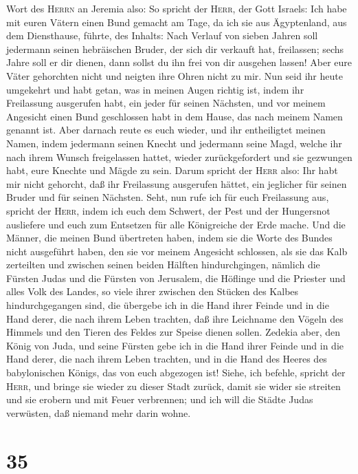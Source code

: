 Wort des \textsc{Herrn} an Jeremia also:  So spricht der
\textsc{Herr}, der Gott Israels: Ich habe mit euren Vätern einen Bund
gemacht am Tage, da ich sie aus Ägyptenland, aus dem Diensthause,
führte, des Inhalts:  Nach Verlauf von sieben Jahren soll
jedermann seinen hebräischen Bruder, der sich dir verkauft hat,
freilassen; sechs Jahre soll er dir dienen, dann sollst du ihn frei von
dir ausgehen lassen! Aber eure Väter gehorchten nicht und neigten ihre
Ohren nicht zu mir.  Nun seid ihr heute umgekehrt und
habt getan, was in meinen Augen richtig ist, indem ihr Freilassung
ausgerufen habt, ein jeder für seinen Nächsten, und vor meinem Angesicht
einen Bund geschlossen habt in dem Hause, das nach meinem Namen genannt
ist.  Aber darnach reute es euch wieder, und ihr
entheiligtet meinen Namen, indem jedermann seinen Knecht und jedermann
seine Magd, welche ihr nach ihrem Wunsch freigelassen hattet, wieder
zurückgefordert und sie gezwungen habt, eure Knechte und Mägde zu sein.
 Darum spricht der \textsc{Herr} also: Ihr habt mir nicht
gehorcht, daß ihr Freilassung ausgerufen hättet, ein jeglicher für
seinen Bruder und für seinen Nächsten. Seht, nun rufe ich für euch
Freilassung aus, spricht der \textsc{Herr}, indem ich euch dem Schwert,
der Pest und der Hungersnot ausliefere und euch zum Entsetzen für alle
Königreiche der Erde mache.  Und die Männer, die meinen
Bund übertreten haben, indem sie die Worte des Bundes nicht ausgeführt
haben, den sie vor meinem Angesicht schlossen, als sie das Kalb
zerteilten und zwischen seinen beiden Hälften hindurchgingen,
 nämlich die Fürsten Judas und die Fürsten von Jerusalem,
die Höflinge und die Priester und alles Volk des Landes, so viele ihrer
zwischen den Stücken des Kalbes hindurchgegangen sind, 
die übergebe ich in die Hand ihrer Feinde und in die Hand derer, die
nach ihrem Leben trachten, daß ihre Leichname den Vögeln des Himmels und
den Tieren des Feldes zur Speise dienen sollen.  Zedekia
aber, den König von Juda, und seine Fürsten gebe ich in die Hand ihrer
Feinde und in die Hand derer, die nach ihrem Leben trachten, und in die
Hand des Heeres des babylonischen Königs, das von euch abgezogen ist!
 Siehe, ich befehle, spricht der \textsc{Herr}, und
bringe sie wieder zu dieser Stadt zurück, damit sie wider sie streiten
und sie erobern und mit Feuer verbrennen; und ich will die Städte Judas
verwüsten, daß niemand mehr darin wohne.

\hypertarget{section-34}{%
\section{35}\label{section-34}}

